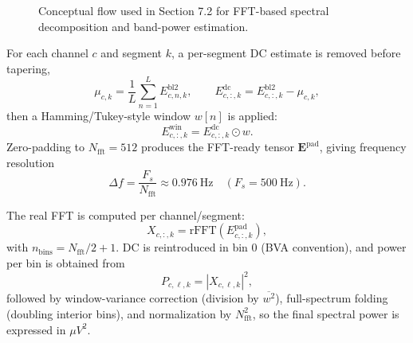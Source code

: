 \begin{figure}[H]
\centering
{}
\caption{Conceptual flow used in Section 7.2 for FFT-based spectral decomposition and band-power estimation.}
\end{figure}

For each channel $c$ and segment $k$, a per-segment DC estimate is removed before tapering,
\[
\mu_{c,k}=\frac{1}{L}\sum_{n=1}^{L}E^{\mathrm{bl2}}_{c,n,k},
\qquad
E^{\mathrm{dc}}_{c,:,k}=E^{\mathrm{bl2}}_{c,:,k}-\mu_{c,k},
\]
then a Hamming/Tukey-style window $w[n]$ is applied:
\[
E^{\mathrm{win}}_{c,:,k}=E^{\mathrm{dc}}_{c,:,k}\odot w.
\]
Zero-padding to $N_{\mathrm{fft}}=512$ produces the FFT-ready tensor $\mathbf{E}^{\mathrm{pad}}$, giving frequency resolution
\[
\Delta f=\frac{F_s}{N_{\mathrm{fft}}}\approx 0.976\ \mathrm{Hz}\quad (F_s=500\ \mathrm{Hz}).
\]

The real FFT is computed per channel/segment:
\[
X_{c,:,k}=\mathrm{rFFT}\!\left(E^{\mathrm{pad}}_{c,:,k}\right),
\]
with $n_{\mathrm{bins}}=N_{\mathrm{fft}}/2+1$. DC is reintroduced in bin 0 (BVA convention), and power per bin is obtained from
\[
P_{c,\ell,k}=|X_{c,\ell,k}|^2,
\]
followed by window-variance correction (division by $\overline{w^2}$), full-spectrum folding (doubling interior bins), and normalization by $N_{\mathrm{fft}}^2$, so the final spectral power is expressed in $\mu V^2$.

